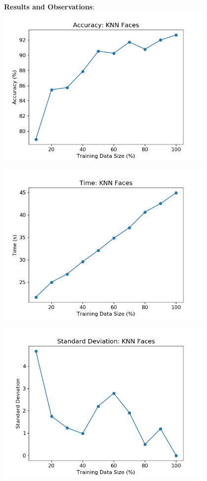 \documentclass{article}
\begin{document}
\textbf{Results and Observations}:\\

\includegraphics[width=0.8\textwidth,height=0.8\textheight,keepaspectratio]{k_f.png}

\includegraphics[width=0.8\textwidth,height=0.8\textheight,keepaspectratio]{k_f-t.png}

\includegraphics[width=0.8\textwidth,height=0.8\textheight,keepaspectratio]{std_kf.png}
\end{document}
